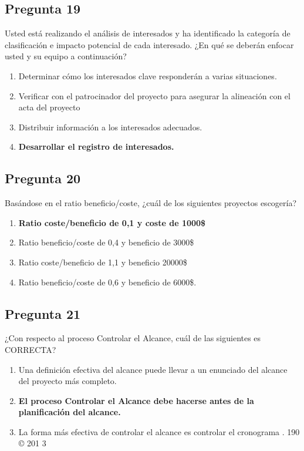 \documentclass[11pt,a4paper]{article}
\begin{document}
\subsection*{Pregunta 19}
Usted está realizando el análisis de interesados y ha identificado la categoría de clasificación e impacto potencial de cada interesado. ¿En qué se deberán enfocar usted y su equipo a continuación?

\begin{enumerate}[label=\alph*)]
  \item Determinar cómo los interesados clave responderán a varias situaciones.
  \item Verificar con el patrocinador del proyecto para asegurar la alineación con el acta del proyecto
  \item Distribuir información a los interesados adecuados.
  \item \textbf{Desarrollar el registro de interesados.}
\end{enumerate}

\subsection*{Pregunta 20}
Basándose en el ratio beneficio/coste, ¿cuál de los siguientes proyectos escogería?

\begin{enumerate}[label=\alph*)]
  \item \textbf{Ratio coste/beneficio de 0,1 y coste de 1000\$}
  \item Ratio beneficio/coste de 0,4 y beneficio de 3000\$
  \item Ratio coste/beneficio de 1,1 y beneficio 20000\$
  \item Ratio beneficio/coste de 0,6 y beneficio de 6000\$.
\end{enumerate}

\subsection*{Pregunta 21}
¿Con respecto al proceso Controlar el Alcance, cuál de las siguientes es CORRECTA?

\begin{enumerate}[label=\alph*)]
  \item Una definición efectiva del alcance puede llevar a un enunciado del alcance del proyecto más completo.
  \item \textbf{El proceso Controlar el Alcance debe hacerse antes de la planificación del alcance.}
  \item La forma más efectiva de controlar el alcance es controlar el cronograma . 190 © 201 3
\end{enumerate}
\end{document}
